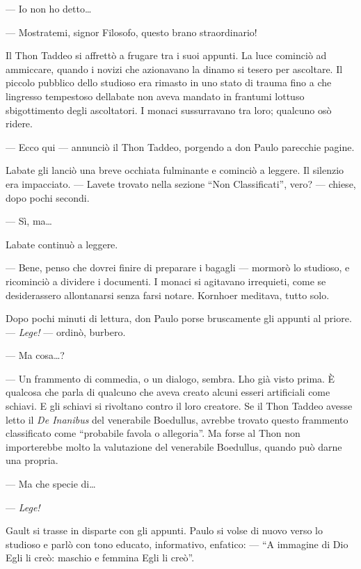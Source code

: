 --- Io non ho detto\ldots{}

--- Mostratemi, signor Filosofo, questo brano straordinario!

Il Thon Taddeo si affrettò a frugare tra i suoi appunti. La luce
cominciò ad ammiccare, quando i novizi che azionavano la dinamo si
tesero per ascoltare. Il piccolo pubblico dello studioso era rimasto in
uno stato di trauma fino a che l\textquotesingle ingresso tempestoso
dell\textquotesingle abate non aveva mandato in frantumi
l\textquotesingle ottuso sbigottimento degli ascoltatori. I monaci
sussurravano tra loro; qualcuno osò ridere.

--- Ecco qui --- annunciò il Thon Taddeo, porgendo a don Paulo parecchie
pagine.

L\textquotesingle abate gli lanciò una breve occhiata fulminante e
cominciò a leggere. Il silenzio era impacciato. ---
L\textquotesingle avete trovato nella sezione ``Non Classificati'',
vero? --- chiese, dopo pochi secondi.

--- Sì, ma\ldots{}

L\textquotesingle abate continuò a leggere.

--- Bene, penso che dovrei finire di preparare i bagagli --- mormorò lo
studioso, e ricominciò a dividere i documenti. I monaci si agitavano
irrequieti, come se desiderassero allontanarsi senza farsi notare.
Kornhoer meditava, tutto solo.

Dopo pochi minuti di lettura, don Paulo porse bruscamente gli appunti al
priore. --- \emph{Lege!} --- ordinò, burbero.

--- Ma cosa\ldots?

--- Un frammento di commedia, o un dialogo, sembra. L\textquotesingle ho
già visto prima. È qualcosa che parla di qualcuno che aveva creato
alcuni esseri artificiali come schiavi. E gli schiavi si rivoltano
contro il loro creatore. Se il Thon Taddeo avesse letto il \emph{De
	Inanibus} del venerabile Boedullus, avrebbe trovato questo frammento
classificato come ``probabile favola o allegoria''. Ma forse al Thon non
importerebbe molto la valutazione del venerabile Boedullus, quando può
darne una propria.

--- Ma che specie di\ldots{}

--- \emph{Lege!}

Gault si trasse in disparte con gli appunti. Paulo si volse di nuovo
verso lo studioso e parlò con tono educato, informativo, enfatico: ---
``A immagine di Dio Egli li creò: maschio e femmina Egli li creò''.

